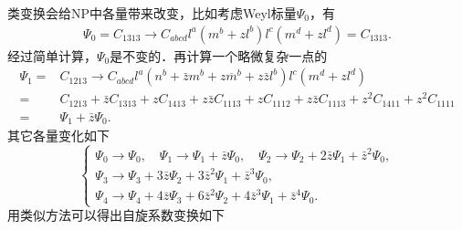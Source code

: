 类变换会给NP中各量带来改变，比如考虑Weyl标量$\Psi_{0}$，有
\begin{align*}
    \Psi_0 =C_{1313}\to C_{abcd}l^a (m^b + z l^b) l^c (m^d + z l^d)
    =C_{1313} .
\end{align*}
经过简单计算，$\Psi_{0}$是不变的．再计算一个略微复杂一点的
\begin{align*}
    \Psi_1 =& C_{1213} \to C_{abcd}l^a (n^b + \bar{z} m^b + z \overline{m}^b + z\bar{z} l^b)
    l^c (m^d + z l^d)     \\
    =& C_{1213} + \bar{z} C_{1313} + z C_{1413} + z\bar{z} C_{1113}
    + zC_{1112} + z\bar{z} C_{1113} + z^2 C_{1411} +z^2 C_{1111} \\
    =& \Psi_1 + \bar{z} \Psi_0 .
\end{align*}
其它各量变化如下
\begin{equation}\label{chnull:eqn_Weyl-I}
    \begin{cases}
        \Psi_{0} \to \Psi_{0}, \quad \Psi_{1} \to \Psi_{1} + \bar{z} \Psi_{0}, \quad
        \Psi_{2} \to \Psi_{2} + 2 \bar{z} \Psi_{1} + \bar{z}^2 \Psi_{0}, \\
        \Psi_{3} \to \Psi_{3} + 3 \bar{z} \Psi_{2} + 3 \bar{z}^2 \Psi_{1} + \bar{z}^3 \Psi_{0}, \\
        \Psi_{4} \to \Psi_{4} + 4 \bar{z} \Psi_{3} + 6 \bar{z}^2 \Psi_{2}
        + 4 \bar{z}^3 \Psi_{1} + \bar{z}^4 \Psi_{0} .
    \end{cases}
\end{equation}
用类似方法可以得出自旋系数变换如下
